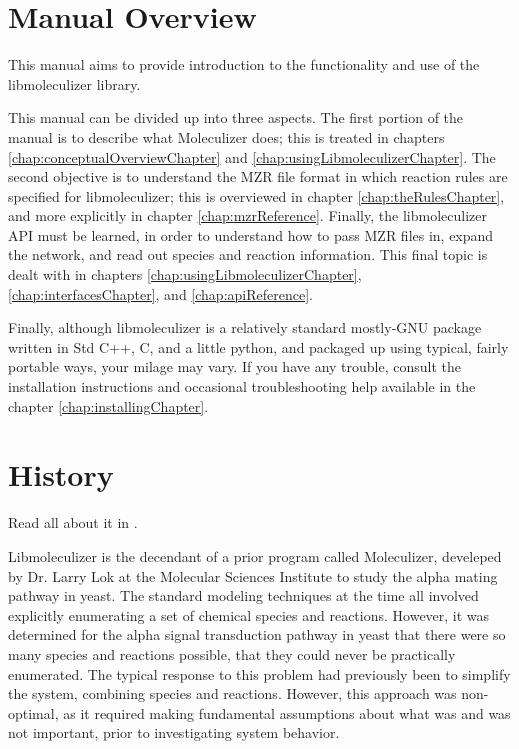 \section{Manual Overview}
This manual aims to provide introduction to the functionality and use
of the libmoleculizer library.  

This manual can be divided up into three aspects.  The first portion
of the manual is to describe what Moleculizer does; this is treated in chapters
\ref{chap:conceptualOverviewChapter} and
\ref{chap:usingLibmoleculizerChapter}.  The second objective is to
understand the MZR file format in which reaction rules are specified
for libmoleculizer; this is overviewed in chapter \ref{chap:theRulesChapter},
and more explicitly in chapter \ref{chap:mzrReference}.  Finally,
the libmoleculizer API must be learned, in order to understand how to
pass MZR files in, expand the network, and read out species and
reaction information.  This final topic is dealt with in chapters
\ref{chap:usingLibmoleculizerChapter}, \ref{chap:interfacesChapter}, and
\ref{chap:apiReference}.

Finally, although libmoleculizer is a relatively standard mostly-GNU
package written in Std C++, C, and a little python, and packaged up
using typical, fairly portable ways, your milage may vary.  If you
have any trouble, consult the installation instructions and
occasional troubleshooting help available in the chapter
\ref{chap:installingChapter}.

\section{History}

Read all about it in \cite{lok05}.

Libmoleculizer is the decendant of a prior program called Moleculizer,
develeped by Dr. Larry Lok at the Molecular Sciences Institute to
study the alpha mating pathway in yeast. The standard modeling
techniques at the time all involved explicitly enumerating a set of
chemical species and reactions. However, it was determined for the
alpha signal transduction pathway in yeast that there were so many
species and reactions possible, that they could never be practically
enumerated. The typical response to this problem had previously been
to simplify the system, combining species and reactions. However,
this approach was non-optimal, as it required making fundamental
assumptions about what was and was not important, prior to
investigating system behavior. 

